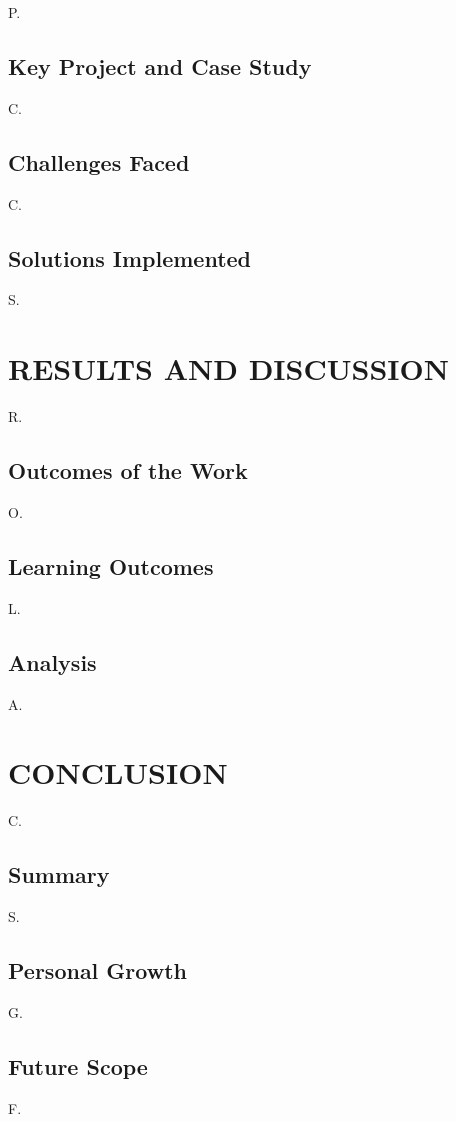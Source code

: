 \documentclass[12pt,a4paper]{report}
\begin{document}
P.


\section{Key Project and Case Study}

C.




\section{Challenges Faced}

C.


\section{Solutions Implemented}

S.


\chapter{RESULTS AND DISCUSSION}


R.




\section{Outcomes of the Work}

O.


\section{Learning Outcomes}

L.


\section{Analysis}

A.




\chapter{CONCLUSION}


C.




\section{Summary}

S.


\section{Personal Growth}

G.


\section{Future Scope}

F.
\end{document}
